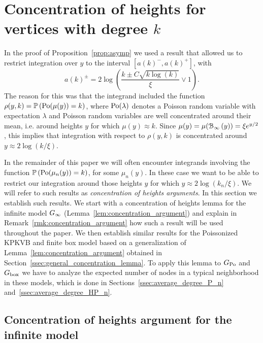 \section{Concentration of heights for vertices with degree $k$}\label{sec:concentration_argument}

In the proof of Proposition~\ref{prop:asymp} we used a result that allowed us to restrict integration over $y$ to the interval $[a(k)^-, a(k)^+]$, with
\[
	a(k)^\pm = 2\log\left(\frac{k \pm C \sqrt{k \log(k)}}{\xi} \vee 1\right).
\]
The reason for this was that the integrand included the function $\rho(y,k) = \mathbb{P}\left({\mathrm{Po}}(\mu(y)) = k\right)$, where ${\mathrm{Po}}(\lambda)$ denotes a Poisson random variable with expectation $\lambda$ and Poisson random variables are well concentrated around their mean, i.e. around heights $y$ for which $\mu(y) \approx k$. Since $\mu(y) = \mu({\mathcal B}_{\infty}\left(y\right)) = \xi e^{y/2}$, this implies that integration with respect to $\rho(y,k)$ is concentrated around $y \approx 2\log(k/\xi)$.

In the remainder of this paper we will often encounter integrands involving the function $\mathbb{P}\left({\mathrm{Po}}(\mu_n(y)) = k\right)$, for some $\mu_n(y)$. In these case we want to be able to restrict our integration around those heights $y$ for which $y \approx 2\log(k_n/\xi)$. We will refer to such results as \emph{concentration of heights arguments}. In this section we establish such results. We start with a concentration of heights lemma for the infinite model $G_{\infty}$ (Lemma~\ref{lem:concentration_argument}) and explain in Remark~\ref{rmk:concentration_argument} how such a result will be used throughout the paper. We then establish similar results for the Poissonized KPKVB and finite box model based on a generalization of Lemma~\ref{lem:concentration_argument} obtained in Section~\ref{ssec:general_concentration_lemma}. To apply this lemma to $G_{\text{Po}}$ and $G_{\text{box}}$ we have to analyze the expected number of nodes in a typical neighborhood in these models, which is done in Sections~\ref{ssec:average_degree_P_n} and~\ref{ssec:average_degree_HP_n}. 

\subsection{Concentration of heights argument for the infinite model}

